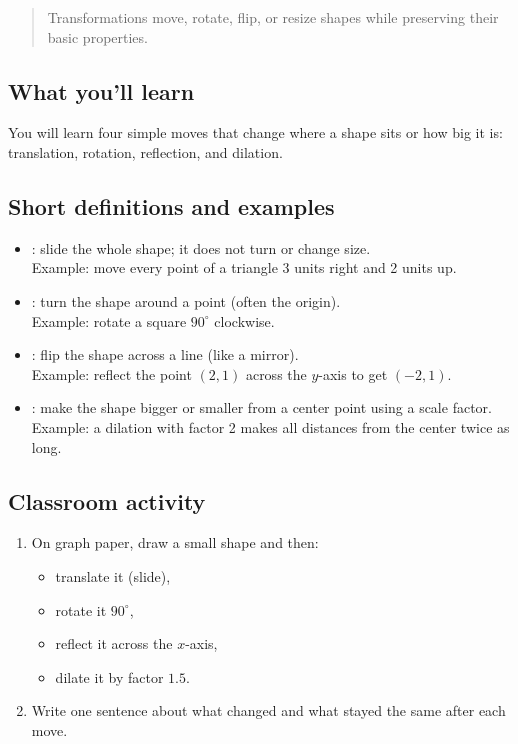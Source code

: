 \blockquote{Transformations move, rotate, flip, or resize shapes while preserving
their basic properties.}

\subsection{What you'll learn}

You will learn four simple moves that change where a shape sits or how big it is:
translation, rotation, reflection, and dilation.

\subsection{Short definitions and examples}

\begin{itemize}
  \item \textbf{}: slide the whole shape; it does not turn or change size. \\
        Example: move every point of a triangle 3 units right and 2 units up.
  \item \textbf{}: turn the shape around a point (often the origin). \\
        Example: rotate a square \(90^\circ\) clockwise.
  \item \textbf{}: flip the shape across a line (like a mirror). \\
        Example: reflect the point \((2,1)\) across the \(y\)-axis to get \((-2,1)\).
  \item \textbf{}: make the shape bigger or smaller from a center point using a scale factor. \\
        Example: a dilation with factor 2 makes all distances from the center twice as long.
\end{itemize}

\subsection{Classroom activity}

\begin{enumerate}
  \item On graph paper, draw a small shape and then:
    \begin{itemize}
      \item translate it (slide), 
      \item rotate it \(90^\circ\),
      \item reflect it across the \(x\)-axis,
      \item dilate it by factor \(1.5\).
    \end{itemize}
  \item Write one sentence about what changed and what stayed the same after each move.
\end{enumerate}



